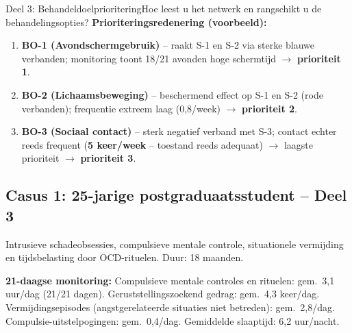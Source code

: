 \documentclass[11pt,a4paper]{article}
\begin{document}
\begin{voorbeeldbox}{Deel 3: Behandeldoelprioritering}{Hoe leest u het netwerk en rangschikt u de behandelingsopties?}
\medskip
\textbf{Prioriteringsredenering (voorbeeld):}
\begin{enumerate}[topsep=2pt,itemsep=1pt,label=\arabic*.]
\item \textbf{BO-1 (Avondschermgebruik)} -- raakt S-1 en S-2 via sterke blauwe verbanden;
monitoring toont 18/21 avonden hoge schermtijd $\rightarrow$ \textbf{prioriteit 1}.
\item \textbf{BO-2 (Lichaamsbeweging)} -- beschermend effect op S-1 en S-2 (rode verbanden);
frequentie extreem laag (0,8/week) $\rightarrow$ \textbf{prioriteit 2}.
\item \textbf{BO-3 (Sociaal contact)} -- sterk negatief verband met S-3; contact echter reeds frequent (\textbf{5 keer/week} -- toestand reeds adequaat) $\rightarrow$ laagste prioriteit $\rightarrow$ \textbf{prioriteit 3}.
\end{enumerate}
\end{voorbeeldbox}

\vspace{0.5em}

\newpage
\subsection*{Casus 1: 25-jarige postgraduaatsstudent -- Deel 3}

\begin{complaintbox}[title={Casus 1: 25-jarige postgraduaatsstudent}]
\small Intrusieve schadeobsessies, compulsieve mentale controle, situationele vermijding en tijdsbelasting door OCD-rituelen. Duur: 18 maanden.
\end{complaintbox}

\begin{monitorbox}
\small\textbf{21-daagse monitoring:} Compulsieve mentale controles en rituelen: gem.\ 3,1 uur/dag (21/21 dagen). Geruststellingszoekend gedrag: gem.\ 4,3 keer/dag. Vermijdingsepisodes (angstgerelateerde situaties niet betreden): gem.\ 2,8/dag. Compulsie-uitstelpogingen: gem.\ 0,4/dag. Gemiddelde slaaptijd: 6,2 uur/nacht.
\end{monitorbox}
\end{document}
